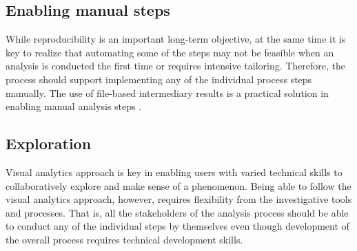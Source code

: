 


\subsection{Enabling manual steps}

While reproducibility is an important long-term objective, at the same time it is key to realize that automating some of the steps may not be feasible when an analysis is conducted the first time or requires intensive tailoring. Therefore, the process should support implementing any of the individual process steps manually. The use of file-based intermediary results is a practical solution in enabling manual analysis steps \citep[cf.][]{Huhtamaki2017ProcessingExperiences}.

\subsection{Exploration}

Visual analytics \citep{Heer2012InteractiveAnalysis} approach is key in enabling users with varied technical skills to collaboratively explore and make sense of a phenomenon. Being able to follow the visual analytics approach, however, requires flexibility from the investigative tools and processes. That is, all the stakeholders of the analysis process should be able to conduct any of the individual steps by themselves even though development of the overall process requires technical development skills.


